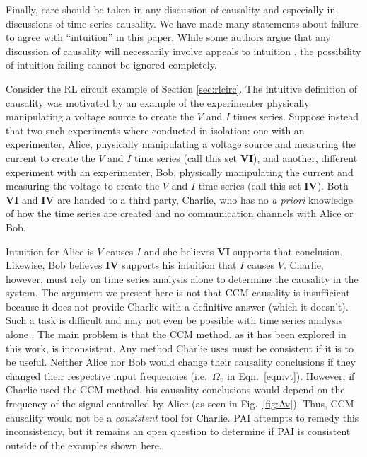 \documentclass[twocolumn,aps,pre,groupedaddress]{revtex4-1}
\begin{document}
Finally, care should be taken in any discussion of causality and especially in discussions of time series causality.  We have made many statements about failure to agree with ``intuition'' in this paper.  While some authors argue that any discussion of causality will necessarily involve appeals to intuition \cite{Pearl2000}, the possibility of intuition failing cannot be ignored completely.  

Consider the RL circuit example of Section \ref{sec:rlcirc}.  The intuitive definition of causality was motivated by an example of the experimenter physically manipulating a voltage source to create the $V$ and $I$ times series.  Suppose instead that two such experiments where conducted in isolation: one with an experimenter, Alice, physically manipulating a voltage source and measuring the current to create the $V$ and $I$ time series (call this set $\mathbf{VI}$), and another, different experiment with an experimenter, Bob, physically manipulating the current and measuring the voltage to create the $V$ and $I$ time series (call this set $\mathbf{IV}$).  Both $\mathbf{VI}$ and $\mathbf{IV}$ are handed to a third party, Charlie, who has no {\em a priori} knowledge of how the time series are created and no communication channels with Alice or Bob.

Intuition for Alice is $V$ causes $I$ and she believes $\mathbf{VI}$ supports that conclusion.  Likewise, Bob believes $\mathbf{IV}$ supports his intuition that $I$ causes $V$.  Charlie, however, must rely on time series analysis alone to determine the causality in the system.  The argument we present here is not that CCM causality is insufficient because it does not provide Charlie with a definitive answer (which it doesn't).  Such a task is difficult and may not even be possible with time series analysis alone \cite{Pearl2000}.  The main problem is that the CCM method, as it has been explored in this work, is inconsistent.  Any method Charlie uses must be consistent if it is to be useful.  Neither Alice nor Bob would change their causality conclusions if they changed their respective input frequencies (i.e.\ $\Omega_v$ in Eqn.\ \ref{eqn:vt}).  However, if Charlie used the CCM method, his causality conclusions would depend on the frequency of the signal controlled by Alice (as seen in Fig.\ \ref{fig:Av}).  Thus, CCM causality would not be a {\em consistent} tool for Charlie.  PAI attempts to remedy this inconsistency, but it remains an open question to determine if PAI is consistent outside of the examples shown here.

%

\end{document}
